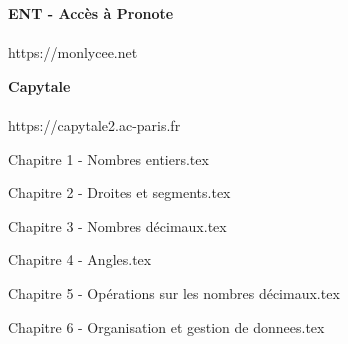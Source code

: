 \documentclass[a4paper,12pt,twoside]{article}
\numberwithin{dummy}{section}
\theoremstyle{ocrenumboxTh}
\theoremstyle{ocrenumboxExercice}
\theoremstyle{ocrenumboxExercice}
\theoremstyle{ocrenumboxEx}
\theoremstyle{ocrenumboxEx}
\theoremstyle{ocrenumboxTh}
\theoremstyle{ocrenumboxTh*}
\theoremstyle{ocrenumboxTh}
\theoremstyle{ocrenumboxTh*}
\theoremstyle{ocrenumboxCoro}
\theoremstyle{ocrenumboxCoro*}
\theoremstyle{ocrenumboxCoro}
\theoremstyle{ocrenumboxCoro*}
\theoremstyle{ocrenumboxProp}
\theoremstyle{ocrenumboxProp*}
\theoremstyle{ocrenumboxProp}
\theoremstyle{ocrenumboxProp*}
\theoremstyle{ocrenumboxMéthode}
\theoremstyle{ocrenumboxMéthode}
\theoremstyle{ocrenumboxDef}
\theoremstyle{ocrenumboxDef*}
\theoremstyle{ocrenumboxDef}
\theoremstyle{ocrenumboxDef*}
\theoremstyle{ocrenumboxReg}
\theoremstyle{ocrenumboxReg*}
\theoremstyle{ocrenumboxReg}
\theoremstyle{ocrenumboxReg*}
\theoremstyle{ocrenumboxVoc}
\theoremstyle{ocrenumboxVoc}
\theoremstyle{ocrenumboxNot}
\theoremstyle{ocrenumboxNot}
\theoremstyle{ocrenumboxNot*}
\theoremstyle{ocrenumboxNot*}
\theoremstyle{ocrenum}
\begin{document}
\begin{minipage}[c]{0.5\linewidth}
   \begin{center}
\textbf{\textcolor{Couleur8}{ENT - Accès à Pronote}}\\
\vspace{5mm}
\\
\vspace{5mm}
\textcolor{Couleur6}{https://monlycee.net}\\
\end{center}
\end{minipage}
\hfill
\begin{minipage}[c]{0.3\linewidth}
     \begin{center}
\textbf{\textcolor{Couleur8}{Capytale}}\\
\vspace{5mm}
\\
\vspace{5mm}
\textcolor{Couleur6}{https://capytale2.ac-paris.fr}\\
\end{center}  
      \end{minipage}
      
      \vfill
      
      \newpage
\tableofcontents

\newpage

{Chapitre 1 - Nombres entiers.tex}

\newpage


{Chapitre 2 - Droites et segments.tex}

\newpage

{Chapitre 3 - Nombres décimaux.tex}

\newpage

{Chapitre 4 - Angles.tex}

\newpage

{Chapitre 5 - Opérations sur les nombres décimaux.tex}

\newpage

{Chapitre 6 - Organisation et gestion de donnees.tex}
\end{document}
